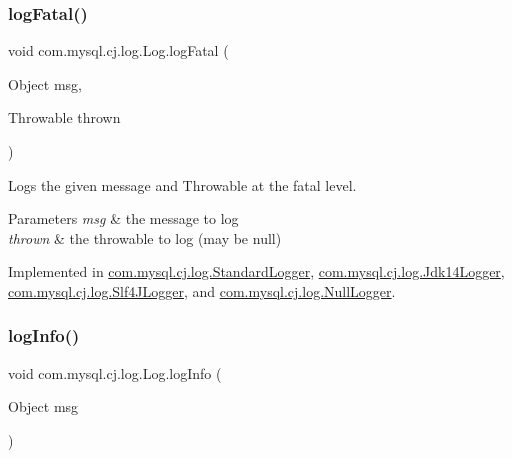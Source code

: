 \mbox{\label{interfacecom_1_1mysql_1_1cj_1_1log_1_1_log_a54cd5e19bf210ab86b373400e2213229}} 
\subsubsection{\texorpdfstring{log\+Fatal()}{logFatal()}\hspace{0.1cm}{\footnotesize\ttfamily [2/2]}}
{\footnotesize\ttfamily void com.\+mysql.\+cj.\+log.\+Log.\+log\+Fatal (\begin{DoxyParamCaption}\item[{Object}]{msg,  }\item[{Throwable}]{thrown }\end{DoxyParamCaption})}

Logs the given message and Throwable at the \textquotesingle{}fatal\textquotesingle{} level.


\begin{DoxyParams}{Parameters}
{\em msg} & the message to log \\
\hline
{\em thrown} & the throwable to log (may be null) \\
\hline
\end{DoxyParams}


Implemented in \mbox{\hyperlink{classcom_1_1mysql_1_1cj_1_1log_1_1_standard_logger_a69e98cb3f558bb0403c602a83dbb515c}{com.\+mysql.\+cj.\+log.\+Standard\+Logger}}, \mbox{\hyperlink{classcom_1_1mysql_1_1cj_1_1log_1_1_jdk14_logger_a63cb086965547119c85338b7238594b9}{com.\+mysql.\+cj.\+log.\+Jdk14\+Logger}}, \mbox{\hyperlink{classcom_1_1mysql_1_1cj_1_1log_1_1_slf4_j_logger_ac61e11ed170d64dec00903990ac86778}{com.\+mysql.\+cj.\+log.\+Slf4\+J\+Logger}}, and \mbox{\hyperlink{classcom_1_1mysql_1_1cj_1_1log_1_1_null_logger_a41fac550645e2405ce00932de06fd9cb}{com.\+mysql.\+cj.\+log.\+Null\+Logger}}.

\mbox{\label{interfacecom_1_1mysql_1_1cj_1_1log_1_1_log_a7f117433067520dd682da12ff9194f4b}} 
\subsubsection{\texorpdfstring{log\+Info()}{logInfo()}\hspace{0.1cm}{\footnotesize\ttfamily [1/2]}}
{\footnotesize\ttfamily void com.\+mysql.\+cj.\+log.\+Log.\+log\+Info (\begin{DoxyParamCaption}\item[{Object}]{msg }\end{DoxyParamCaption})}

